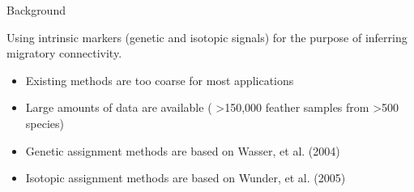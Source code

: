 \documentclass[11pt,ignorenonframetext,]{beamer}
\providecommand{\tightlist}{%
  \setlength{\itemsep}{0pt}\setlength{\parskip}{0pt}}
\begin{document}
\begin{frame}{Background}

Using intrinsic markers (genetic and isotopic signals) for the purpose
of inferring migratory connectivity.

\vspace{2mm}

\begin{itemize}
\tightlist
\item
  Existing methods are too coarse for most applications
\end{itemize}

\vspace{2mm}

\begin{itemize}
\tightlist
\item
  Large amounts of data are available ( \textgreater{}150,000 feather
  samples from \textgreater{}500 species)
\end{itemize}

\vspace{2mm}

\begin{itemize}
\tightlist
\item
  Genetic assignment methods are based on Wasser, et al. (2004)
\end{itemize}

\vspace{2mm}

\begin{itemize}
\tightlist
\item
  Isotopic assignment methods are based on Wunder, et al. (2005)
\end{itemize}

\end{frame}
\end{document}
